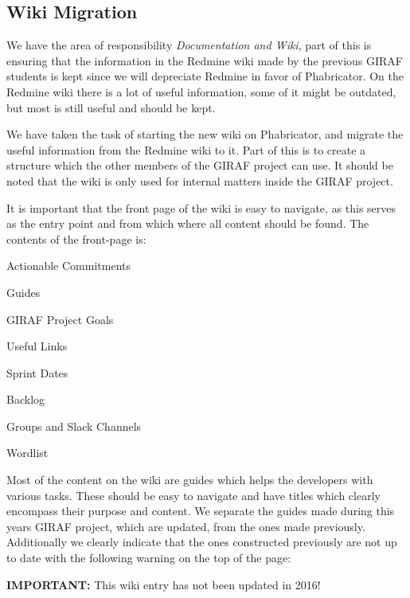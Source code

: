 \subsection{Wiki Migration}
We have the area of responsibility \textit{Documentation and Wiki}, part of this is ensuring that the information in the Redmine wiki made by the previous GIRAF students is kept since we will depreciate Redmine in favor of Phabricator.
On the Redmine wiki there is a lot of useful information, some of it might be outdated, but most is still useful and should be kept.

We have taken the task of starting the new wiki on Phabricator, and migrate the useful information from the Redmine wiki to it.
Part of this is to create a structure which the other members of the GIRAF project can use.
It should be noted that the wiki is only used for internal matters inside the GIRAF project.

It is important that the front page of the wiki is easy to navigate, as this serves as the entry point and from which where all content should be found.
The contents of the front-page is:

\begin{multicols}{2}
    \begin{enumberate}
    \item Actionable Commitments
    \item Guides
    \item GIRAF Project Goals
    \item Useful Links
    \item Sprint Dates
    \item Backlog
    \item Groups and Slack Channels
    \item Wordlist
    \end{enumberate}
\end{multicols}

Most of the content on the wiki are guides which helps the developers with various tasks.
These should be easy to navigate and have titles which clearly encompass their purpose and content.
We separate the guides made during this years GIRAF project, which are updated, from the ones made previously.
Additionally we clearly indicate that the ones constructed previously are not up to date with the following warning on the top of the page:

\begin{tcolorbox}[enhanced, borderline west={1mm}{0pt}{wiki_important_line}, colback=wiki_important, colframe=wiki_important, sharp corners]
%
\textcolor{wiki_important_text}{\textbf{IMPORTANT:}} This wiki entry has not been updated in 2016!
\end{tcolorbox}

